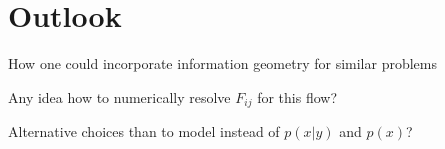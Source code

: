 \section{Outlook}

How one could incorporate information geometry for similar problems

Any idea how to numerically resolve $F_{ij}$ for this flow?

Alternative choices than to model instead of $p(x|y)$ and $p(x)$?